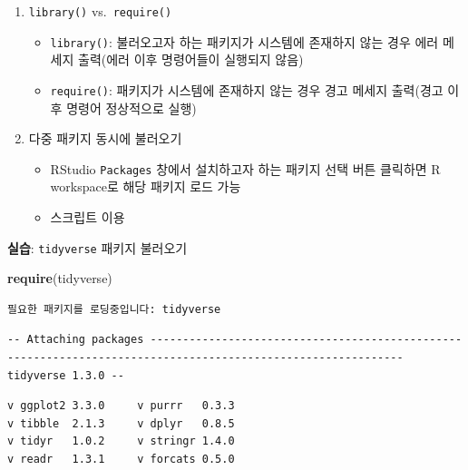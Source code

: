 \documentclass[
  11pt,
]{krantz}
\newenvironment{Shaded}{\begin{snugshade}}{\end{snugshade}}
\newcommand{\KeywordTok}[1]{\textcolor[rgb]{0.27,0.27,0.27}{\textbf{#1}}}
\newcommand{\NormalTok}[1]{#1}
\providecommand{\tightlist}{%
  \setlength{\itemsep}{0pt}\setlength{\parskip}{0pt}}
\let\BeginKnitrBlock\begin \let\EndKnitrBlock\end
\begin{document}
\begin{enumerate}
\def\labelenumi{\arabic{enumi}.}
\tightlist
\item
  \texttt{library()} vs.~\texttt{require()}

  \begin{itemize}
  \tightlist
  \item
    \texttt{library()}: 불러오고자 하는 패키지가 시스템에 존재하지 않는 경우 에러 메세지 출력(에러 이후 명령어들이 실행되지 않음)
  \item
    \texttt{require()}: 패키지가 시스템에 존재하지 않는 경우 경고 메세지 출력(경고 이후 명령어 정상적으로 실행)
  \end{itemize}
\item
  다중 패키지 동시에 불러오기

  \begin{itemize}
  \tightlist
  \item
    RStudio \texttt{Packages} 창에서 설치하고자 하는 패키지 선택 버튼 클릭하면 R workspace로 해당 패키지 로드 가능
  \item
    스크립트 이용
  \end{itemize}
\end{enumerate}

\footnotesize

\BeginKnitrBlock{rmdimportant}
\textbf{실습}: \texttt{tidyverse} 패키지 불러오기
\EndKnitrBlock{rmdimportant}

\normalsize

\footnotesize

\begin{Shaded}
\begin{Highlighting}[]
\KeywordTok{require}\NormalTok{(tidyverse)}
\end{Highlighting}
\end{Shaded}

\begin{verbatim}
필요한 패키지를 로딩중입니다: tidyverse
\end{verbatim}

\begin{verbatim}
-- Attaching packages ------------------------------------------------------------------------------------------------------------- tidyverse 1.3.0 --
\end{verbatim}

\begin{verbatim}
v ggplot2 3.3.0     v purrr   0.3.3
v tibble  2.1.3     v dplyr   0.8.5
v tidyr   1.0.2     v stringr 1.4.0
v readr   1.3.1     v forcats 0.5.0
\end{verbatim}
\end{document}
